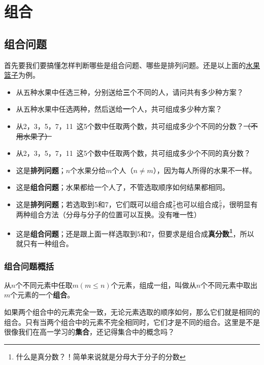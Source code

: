 \section{\textbf{组合}}

\subsection{组合问题}

首先要我们要搞懂怎样判断哪些是组合问题、哪些是排列问题。还是以上面的\underline{水果篮子}为例。
\begin{itemize}
    \item 从五种水果中任选三种，分别送给\textbf{三}个不同的人，请问共有多少种方案？
    \item 从五种水果中任选两种，然后送给\textbf{一}个人，共可组成多少种方案？
    \item 从2，3，5，7，11~这5个数中任取两个数，共可组成多少个不同的分数？\sout{（不用水果了）}
    \item 从2，3，5，7，11~这5个数中任取两个数，共可组成多少个不同的真分数？
\end{itemize}

\leftline{{\color{blue} {\large 解答}}}
\begin{itemize}
    \item 这是\textbf{排列问题}；$n$个水果分给$m$个人（$n \ne m$），因为每人所得的水果不一样。
    \item 这是\textbf{组合问题}；水果都给一个人了，不管选取顺序如何结果都相同。%
    \item 这是\textbf{排列问题}；若选取到5和7，它们既可以组合成$\frac{7}{5}$也可以组合成$\frac{5}{7}$，很明显有两种组合方法（分母与分子的位置可以互换。没有唯一性）
    \item 这是\textbf{组合问题}；还是跟上面一样选取到5和7，但要求是组合成\textbf{真分数\footnote{什么是真分数？！简单来说就是分母大于分子的分数}}，所以就只有一种组合。
\end{itemize}

\subsubsection{组合问题概括}
从$n$个不同元素中任取$m(m \le n)$个元素，组成一组，叫做从$n$个不同元素中取出$m$个元素的一个\textbf{组合}。

如果两个组合中的元素完全一致，无论元素选取的顺序如何，那么它们就是相同的组合。只有当两个组合中的元素不完全相同时，它们才是不同的组合。这里是不是很像我们在高一学习的\textbf{集合}，还记得集合中的概念吗？

